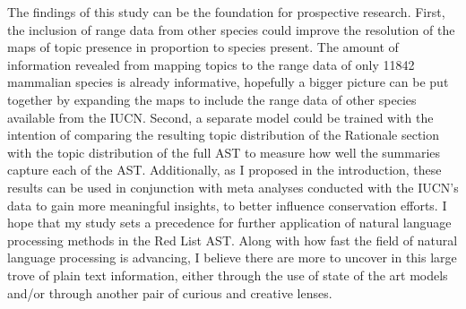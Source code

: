 The findings of this study can be the foundation for prospective research. First, the inclusion of range data from other species could improve the resolution of the maps of topic presence in proportion to species present. The amount of information revealed from mapping topics to the range data of only 11842 mammalian species is already informative, hopefully a bigger picture can be put together by expanding the maps to include the range data of other species available from the IUCN. Second, a separate model could be trained with the intention of comparing the resulting topic distribution of the Rationale section with the topic distribution of the full AST to measure how well the summaries capture each of the AST. Additionally, as I proposed in the introduction, these results can be used in conjunction with meta analyses conducted with the IUCN's data to gain more meaningful insights, to better influence conservation efforts. I hope that my study sets a precedence for further application of natural language processing methods in the Red List AST. Along with how fast the field of natural language processing is advancing, I believe there are more to uncover in this large trove of plain text information, either through the use of state of the art models and/or through another pair of curious and creative lenses. 